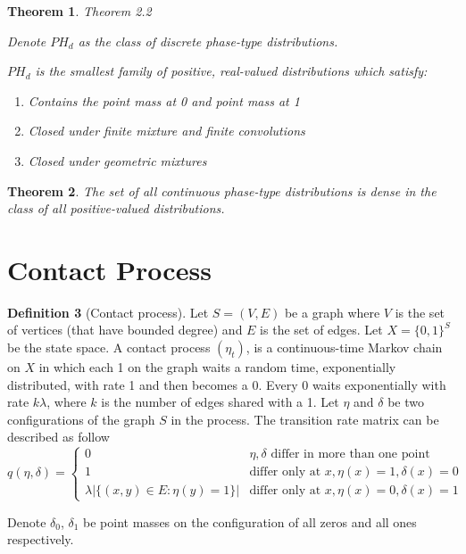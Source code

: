 \documentclass{article}
\theoremstyle{plain}
\newtheorem{theorem}{Theorem}[section]
\theoremstyle{definition}
\newtheorem{defn}[theorem]{Definition}
\theoremstyle{remark}
\numberwithin{equation}{section}
\begin{document}
\begin{theorem}\cite{maier1992} Theorem 2.2

Denote $PH_d$ as the class of discrete phase-type distributions.

$PH_d$ is the smallest family of positive, real-valued distributions which satisfy:
\begin{enumerate}
    \item Contains the point mass at 0 and point mass at 1
    \item Closed under finite mixture and finite convolutions
    \item Closed under geometric mixtures
\end{enumerate}
\end{theorem}

\begin{theorem} \cite{neuts1981}
The set of all continuous phase-type distributions is dense in the class of all positive-valued distributions.
\end{theorem}


\section{Contact Process}

\begin{defn}[Contact process]
Let $S = (V,E)$ be a graph where $V$ is the set of vertices (that have bounded degree) and $E$ is the set of edges.
Let $X =  \{0,1\}^S$ be the state space.
A contact process $(\eta_t)$, is a continuous-time Markov chain on $X$ in which each 1 on the graph waits a random time, exponentially distributed, with rate 1 and then becomes a 0.
Every 0 waits exponentially with rate $k \lambda$, where $k$ is the number of edges shared with a 1.
Let $\eta$ and $\delta$ be two configurations of the graph $S$ in the process.
The transition rate matrix can be described as follow
$$
q(\eta, \delta) = \begin{cases}
    0 & \eta, \delta \text{ differ in more than one point}\\
    1 & \text{differ only at } x, \eta(x) = 1, \delta(x) = 0\\
    \lambda |\{ (x,y) \in E : \eta(y) = 1\}| & \text{differ only at } x, \eta(x) = 0, \delta(x) = 1
\end{cases}
$$

Denote $\delta_0$, $\delta_1$ be point masses on the configuration of all zeros and all ones respectively.
\end{defn}
\end{document}
